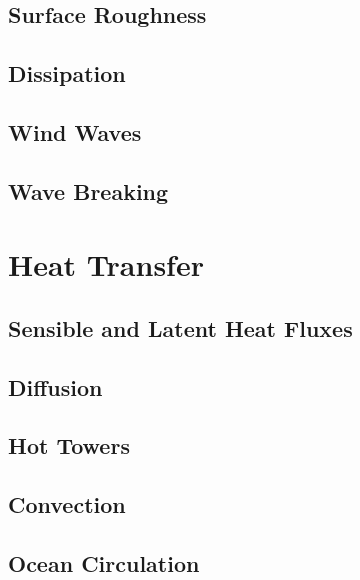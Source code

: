 \documentclass{report}
\begin{document}
    \section{Surface Roughness}
\label{surfaceroughness}
    \lipsum[1-2]

    \section{Dissipation}
\label{dissipation}
    \lipsum[1-2]  	

    \section{Wind Waves}
\label{windwaves}
    \lipsum[1-2]

    \section{Wave Breaking}
\label{momwavebreaking}
    \lipsum[1-2]

\chapter{Heat Transfer}
\label{heattransfer}
    \lipsum[10]
  
    \section{Sensible and Latent Heat Fluxes}
\label{heatflux}
    \lipsum[1-2]
   
    \section{Diffusion}
\label{diffusion}
    \lipsum[1-2]

    \section{Hot Towers}
\label{hottowers}
    \lipsum[1-2]

    \section{Convection}
\label{convection}
    \lipsum[1-2]

    \section{Ocean Circulation}
\label{circulation}
    \lipsum[1-2]
\end{document}
